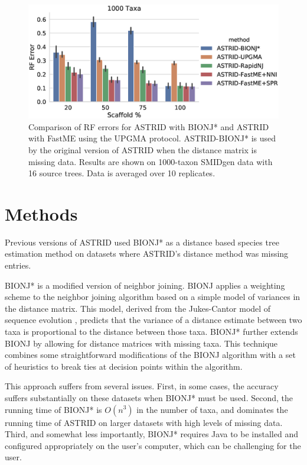 \begin{figure}[!htb]
    \centering
    \includegraphics[width=\textwidth]{astrid-missing-figs/astrid-bionj-errs.eps}
    \caption[Error rates for ASTRID with BIONJ* and ASTRID with FastME using the UPGMA protocol]{Comparison of RF errors for ASTRID with BIONJ* and ASTRID with FastME using the UPGMA protocol. ASTRID-BIONJ* is used by the original version of ASTRID when the distance matrix is missing data. Results are shown on 1000-taxon SMIDgen data with 16 source trees. Data is averaged over 10 replicates.}
    \label{astrid-missing::fig:astrid-bionj-errs}
\end{figure}

\section{Methods}
Previous versions of ASTRID used BIONJ* as a distance based species tree estimation method on datasets where ASTRID's distance method was missing entries.

BIONJ* is a modified version of neighbor joining. BIONJ \cite{gascuel1997bionj} applies a weighting scheme to the neighbor joining algorithm based on a simple model of variances in the distance matrix. This model, derived from the Jukes-Cantor model of sequence evolution \cite{jukes1969evolution}, predicts that the variance of a distance estimate between two taxa is proportional to the distance between those taxa. BIONJ* further extends BIONJ by allowing for distance matrices with missing taxa. This technique combines some straightforward modifications of the BIONJ algorithm with a set of heuristics to break ties at decision points within the algorithm.

This approach suffers from several issues. First, in some cases, the accuracy suffers substantially on these datasets when BIONJ* must be used. Second, the running time of BIONJ* is $O(n^3)$ in the number of taxa, and dominates the running time of ASTRID on larger datasets with high levels of missing data. Third, and somewhat less importantly, BIONJ* requires Java to be installed and configured appropriately on the user's computer, which can be challenging for the user. 

